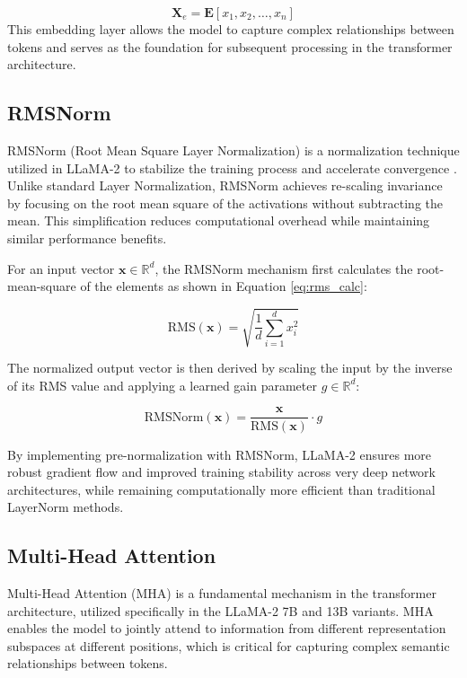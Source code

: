 \begin{equation}
\mathbf{X}_e = \mathbf{E}[x_1, x_2, \dots, x_n]
\end{equation}
This embedding layer allows the model to capture complex relationships between tokens and serves as the foundation for subsequent processing in the transformer architecture.

\subsection{RMSNorm}
RMSNorm (Root Mean Square Layer Normalization) is a normalization technique utilized in LLaMA-2 to stabilize the training process and accelerate convergence \cite{zhang2019rmsnorm}. Unlike standard Layer Normalization, RMSNorm achieves re-scaling invariance by focusing on the root mean square of the activations without subtracting the mean. This simplification reduces computational overhead while maintaining similar performance benefits.



For an input vector $\mathbf{x} \in \mathbb{R}^d$, the RMSNorm mechanism first calculates the root-mean-square of the elements as shown in Equation \ref{eq:rms_calc}:

\begin{equation}
\label{eq:rms_calc}
\text{RMS}(\mathbf{x}) = \sqrt{\frac{1}{d} \sum_{i=1}^{d} x_i^2}
\end{equation}

The normalized output vector is then derived by scaling the input by the inverse of its RMS value and applying a learned gain parameter $g \in \mathbb{R}^d$:

\begin{equation}
\text{RMSNorm}(\mathbf{x}) = \frac{\mathbf{x}}{\text{RMS}(\mathbf{x})} \cdot g
\end{equation}

By implementing pre-normalization with RMSNorm, LLaMA-2 ensures more robust gradient flow and improved training stability across very deep network architectures, while remaining computationally more efficient than traditional LayerNorm methods.




\subsection{Multi-Head Attention}
Multi-Head Attention (MHA) is a fundamental mechanism in the transformer architecture, utilized specifically in the LLaMA-2 7B and 13B variants. MHA enables the model to jointly attend to information from different representation subspaces at different positions, which is critical for capturing complex semantic relationships between tokens.




